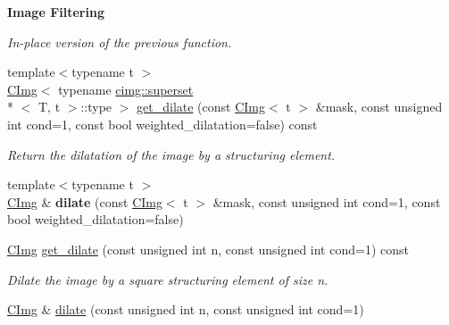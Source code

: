 \begin{Indent}{\bf Image Filtering}
\begin{DoxyCompactItemize}
\begin{DoxyCompactList}\small\item\em In-\/place version of the previous function. \end{DoxyCompactList}\item 
\hypertarget{structcimg__library_1_1_c_img_a613fe0267450a4a7218c10f53f0934b5}{{\footnotesize template$<$typename t $>$ }\\\hyperlink{structcimg__library_1_1_c_img}{C\-Img}$<$ typename \hyperlink{structcimg__library_1_1cimg_1_1superset}{cimg\-::superset}\\*
$<$ T, t $>$\-::type $>$ \hyperlink{structcimg__library_1_1_c_img_a613fe0267450a4a7218c10f53f0934b5}{get\-\_\-dilate} (const \hyperlink{structcimg__library_1_1_c_img}{C\-Img}$<$ t $>$ \&mask, const unsigned int cond=1, const bool weighted\-\_\-dilatation=false) const }\label{structcimg__library_1_1_c_img_a613fe0267450a4a7218c10f53f0934b5}

\begin{DoxyCompactList}\small\item\em Return the dilatation of the image by a structuring element. \end{DoxyCompactList}\item 
\hypertarget{structcimg__library_1_1_c_img_a10694430380a363b60b64f7dc4e3cdf3}{{\footnotesize template$<$typename t $>$ }\\\hyperlink{structcimg__library_1_1_c_img}{C\-Img} \& {\bfseries dilate} (const \hyperlink{structcimg__library_1_1_c_img}{C\-Img}$<$ t $>$ \&mask, const unsigned int cond=1, const bool weighted\-\_\-dilatation=false)}\label{structcimg__library_1_1_c_img_a10694430380a363b60b64f7dc4e3cdf3}

\item 
\hypertarget{structcimg__library_1_1_c_img_a093d140e06d642c9087bb9686c3abb59}{\hyperlink{structcimg__library_1_1_c_img}{C\-Img} \hyperlink{structcimg__library_1_1_c_img_a093d140e06d642c9087bb9686c3abb59}{get\-\_\-dilate} (const unsigned int n, const unsigned int cond=1) const }\label{structcimg__library_1_1_c_img_a093d140e06d642c9087bb9686c3abb59}

\begin{DoxyCompactList}\small\item\em Dilate the image by a square structuring element of size n. \end{DoxyCompactList}\item 
\hypertarget{structcimg__library_1_1_c_img_abb250fc736ffe2f047e8750ecaef5b3a}{\hyperlink{structcimg__library_1_1_c_img}{C\-Img} \& \hyperlink{structcimg__library_1_1_c_img_abb250fc736ffe2f047e8750ecaef5b3a}{dilate} (const unsigned int n, const unsigned int cond=1)}\label{structcimg__library_1_1_c_img_abb250fc736ffe2f047e8750ecaef5b3a}


\end{DoxyCompactItemize}
\end{Indent}
